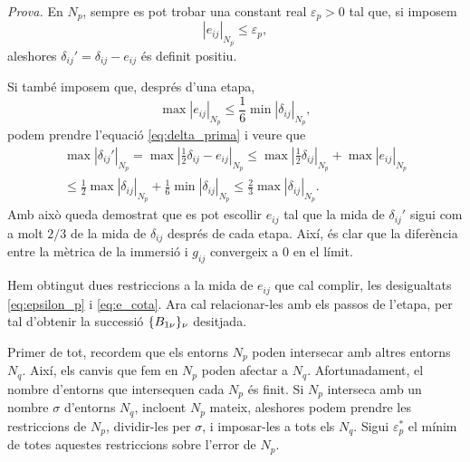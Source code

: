 {\color{black} \textit{Prova.} 
En $N_p$, sempre es pot trobar una constant real $\varepsilon_p>0$ tal que, si imposem 
\begin{equation}\label{eq:epsilon_p}
    |e_{ij}|_{N_p} \le \varepsilon_p,
\end{equation}
aleshores $\delta_{ij}'= \delta_{ij} - e_{ij}$ és definit positiu.

Si també imposem que, després d'una etapa,
\begin{equation}\label{eq:e_cota}
    \max|e_{ij}|_{N_p} \le \frac16\min|\delta_{ij}|_{N_p},
\end{equation}
podem prendre l'equació \eqref{eq:delta_prima} i veure que
\begin{align}\label{eq:delta_prima_cota}
    \nonumber\max|\delta_{ij}'|_{N_p} = \max\left|\frac12\delta_{ij} - e_{ij}\right|_{N_p} \le \max\left|\frac12\delta_{ij}\right|_{N_p} + \max|e_{ij}|_{N_p} \\
    \le \frac12\max|\delta_{ij}|_{N_p} + \frac16\min|\delta_{ij}|_{N_p} \le \frac23\max|\delta_{ij}|_{N_p}.
\end{align}
Amb això queda demostrat que es pot escollir $e_{ij}$ tal que la mida de $\delta_{ij}'$ sigui com a molt $2/3$ de la mida de $\delta_{ij}$ després de cada etapa. Així, és clar que la diferència entre la mètrica de la immersió i $g_{ij}$ convergeix a $0$ en el límit.

Hem obtingut dues restriccions a la mida de $e_{ij}$ que cal complir, les desigualtats \eqref{eq:epsilon_p} i \eqref{eq:e_cota}. Ara cal relacionar-les amb els passos de l'etapa, per tal d'obtenir la successió $\{B_{1\nu}\}_{\nu}$ desitjada. 

Primer de tot, recordem que els entorns $N_p$ poden intersecar amb altres entorns $N_q$. Així, els canvis que fem en $N_p$ poden afectar a $N_q$. Afortunadament, el nombre d'entorns que intersequen cada $N_p$ és finit. Si $N_p$ interseca amb un nombre $\sigma$ d'entorns $N_q$, incloent $N_p$ mateix, aleshores podem prendre les restriccions de $N_p$, dividir-les per $\sigma$, i imposar-les a tots els $N_q$. Sigui $\varepsilon_p^*$ el mínim de totes aquestes restriccions sobre l'error de $N_p$.

}
